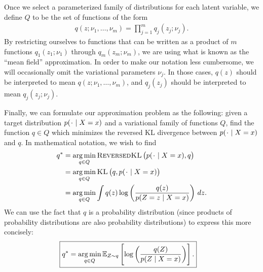 \documentclass[11pt]{article}
\newcommand{\KL}[2]{\textsc{KL}\left( {#1} , {#2} \right)}
\newcommand{\rKL}[2]{\textsc{ReversedKL}\left( {#1} , {#2} \right)}
\newcommand*{\placeholder}{\makebox[1ex]{$\cdot$}}
\begin{document}
Once we select a parameterized family of distributions for each latent variable, we define $Q$ to be the set of functions of the form
\begin{align}
q(z; \nu_1, \ldots, \nu_m) = \prod_{j=1}^m q_j(z_j; \nu_j).
\end{align}
By restricting ourselves to functions that can be written as a product of $m$ functions $q_1(z_1; \nu_1)$ through $q_m(z_m; \nu_m)$, we are using what is known as the ``mean field'' approximation.
In order to make our notation less cumbersome, we will occasionally omit the variational parameters $\nu_j$.
In those cases, $q(z)$ should be interpreted to mean $q(z; \nu_1, \ldots, \nu_m)$, and $q_j(z_j)$ should be interpreted to mean $q_j(z_j; \nu_j)$.

Finally, we can formulate our approximation problem as the following:
given a target distribution $p(\placeholder \mid X=x)$ and a variational family of functions $Q$, find the function $q \in Q$ which minimizes the reversed KL divergence between $p(\placeholder \mid X = x)$ and $q$.
In mathematical notation, we wish to find
\begin{align}
q^*
&= \argmin_{q \in Q} \rKL{p(\placeholder \mid X = x)}{q} \\
&= \argmin_{q \in Q} \KL{q}{p(\placeholder \mid X = x)} \\
&= \argmin_{q \in Q} \int q(z) \log \left( \frac{q(z)}{p(Z = z \mid X = x)} \right) \, dz.
\end{align}
We can use the fact that $q$ is a probability distribution (since products of probability distributions are also probability distributions) to express this more concisely:
\begin{align}
\Aboxed{
q^*
&= \argmin_{q \in Q} \expectOver{Z \sim q}{ \log \left( \frac{q(Z)}{p(Z \mid X = x)} \right) }.
}
\label{eq:qstarUnsimplified}
\end{align}
\end{document}
